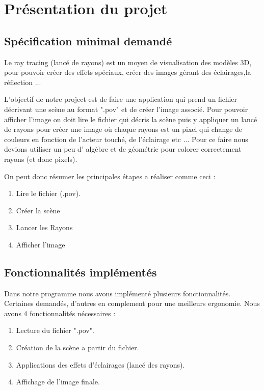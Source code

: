 \documentclass[12pt]{article}
\begin{document}
	\section{Présentation du projet}
	\subsection{Spécification minimal demandé}
	    Le ray tracing (lancé de rayons) est un moyen de visualisation des modèles 3D, pour pouvoir créer des effets spéciaux, créer des images gérant des éclairages,la réflection ...
	    
	    L'objectif de notre project est de faire une application qui prend un fichier décrivant une scène au format ".pov" et de créer l'image associé. Pour pouvoir afficher l'image on doit lire le fichier qui décris la scène puis y appliquer un lancé de rayons pour créer une image où chaque rayons est un pixel qui change de couleurs en fonction de l'acteur touché, de l'éclairage etc ... Pour ce faire nous devions utiliser un peu d' algèbre et de géométrie pour colorer correctement rayons (et donc pixels).
	    
	    On peut donc résumer les principales étapes a réaliser comme ceci :
	    
            \begin{enumerate}
                \item Lire le fichier (.pov).
                \item Créer la scène
                \item Lancer les Rayons
                \item Afficher l'image
            \end{enumerate}
    \subsection{Fonctionnalités implémentés}
        Dans notre programme nous avons implémenté plusieurs fonctionnalités. Certaines demandés, d'autres en complement pour une meilleurs ergonomie. Nous avons 4 fonctionnalités nécessaires :
        
        \begin{enumerate}
            \item Lecture du fichier ".pov".
            \item Création de la scène a partir du fichier.
            \item Applications des effets d'éclairages (lancé des rayons).
            \item Affichage de l'image finale.
        \end{enumerate}
        
\end{document}
